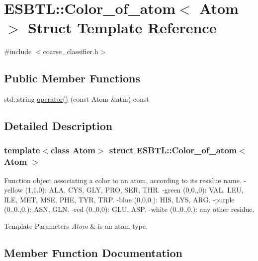 \hypertarget{structESBTL_1_1Color__of__atom}{}\section{E\+S\+B\+TL\+:\+:Color\+\_\+of\+\_\+atom$<$ Atom $>$ Struct Template Reference}
\label{structESBTL_1_1Color__of__atom}


{\ttfamily \#include $<$coarse\+\_\+classifier.\+h$>$}

\subsection*{Public Member Functions}
\begin{DoxyCompactItemize}
\item 
std\+::string \hyperlink{structESBTL_1_1Color__of__atom_a44548b972070d6177a819cfb6ff54248}{operator()} (const Atom \&atm) const
\end{DoxyCompactItemize}


\subsection{Detailed Description}
\subsubsection*{template$<$class Atom$>$\newline
struct E\+S\+B\+T\+L\+::\+Color\+\_\+of\+\_\+atom$<$ Atom $>$}

Function object associating a color to an atom, according to its residue name. -\/yellow (1,1,0)\+: A\+LA, C\+YS, G\+LY, P\+RO, S\+ER, T\+HR. -\/green (0,0.,0)\+: V\+AL, L\+EU, I\+LE, M\+ET, M\+SE, P\+HE, T\+YR, T\+RP. -\/blue (0,0,0.)\+: H\+IS, L\+YS, A\+RG. -\/purple (0.,0.,0.)\+: A\+SN, G\+LN. -\/red (0.,0,0)\+: G\+LU, A\+SP. -\/white (0.,0.,0.)\+: any other residue. 
\begin{DoxyTemplParams}{Template Parameters}
{\em Atom} & is an atom type. \\
\hline
\end{DoxyTemplParams}


\subsection{Member Function Documentation}
\mbox{\label{structESBTL_1_1Color__of__atom_a44548b972070d6177a819cfb6ff54248}} 
